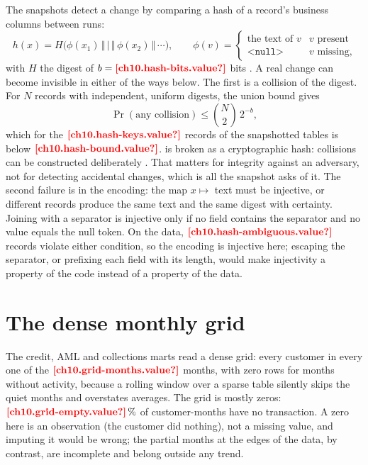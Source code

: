 The snapshots detect a change by comparing a hash of a record's business columns between runs:
\begin{equation}\label{eq:cf-hash}
  h(x) = H\bigl(\phi(x_1) \,\Vert\, \texttt{|} \,\Vert\, \phi(x_2) \,\Vert\, \cdots\bigr), \qquad
  \phi(v) = \begin{cases} \text{the text of } v & v \text{ present} \\ \texttt{<null>} & v \text{ missing,} \end{cases}
\end{equation}
with $H$ the  digest of $b = \est{ch10.hash-bits}{value}$ bits \autocite{rivest1992}. A real change can become
invisible in either of the ways below. The first is a collision of the digest. For $N$ records with independent, uniform digests, the union bound gives
\begin{equation}\label{eq:cf-birthday}
  \Pr(\text{any collision}) \le \binom{N}{2}\, 2^{-b},
\end{equation}
which for the $\est{ch10.hash-keys}{value}$ records of the snapshotted tables is below $\est{ch10.hash-bound}{value}$.
 is broken as a cryptographic hash: collisions can be constructed deliberately \autocite{wang2005}. That matters for
integrity against an adversary, not for detecting accidental changes, which is all the snapshot asks of it. The second
failure is in the encoding: the map $x \mapsto$ text must be injective, or different records produce the same text and
the same digest with certainty. Joining with a separator is injective only if no field contains the separator and no
value equals the null token. On the data, $\est{ch10.hash-ambiguous}{value}$ records violate either condition, so the
encoding is injective here; escaping the separator, or prefixing each field with its length, would make injectivity a
property of the code instead of a property of the data.

\section{The dense monthly grid}\label{sec:cf-grid}

The credit, AML and collections marts read a dense grid: every customer in every one of the $\est{ch10.grid-months}{value}$
months, with zero rows for months without activity, because a rolling window over a sparse table silently skips the
quiet months and overstates averages. The grid is mostly zeros: $\est{ch10.grid-empty}{value}\,\%$ of customer-months have no
transaction. A zero here is an observation (the customer did nothing), not a missing value, and imputing it would be
wrong; the partial months at the edges of the data, by contrast, are incomplete and belong outside any trend.

